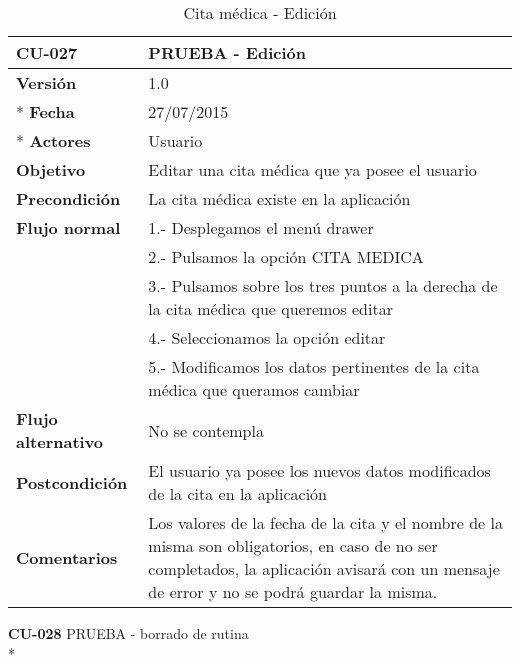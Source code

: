 \documentclass[../pfc.tex]{subfiles}
\begin{document}
		\begin{table}[H]
			\centering
			\begin{tabular}[t]{|p{3cm}|p{9.5cm}|}
				\hline \textbf{CU-027} & \textbf{PRUEBA - Edición} \\*
				\hline\hline \textbf{Versión} & 1.0 \\ *
				\hline\hline \textbf{Fecha} & 27/07/2015 \\ *
				\hline\textbf{Actores} 	& Usuario\\*
				\hline \textbf{Objetivo} & Editar una cita médica que ya posee el usuario\\* 			
				\hline \textbf{Precondición} & La cita médica existe en la aplicación\\* 
				\hline \textbf{Flujo normal} & 1.- Desplegamos el menú drawer \\* 
				& 2.- Pulsamos la opción CITA MEDICA\\*	
				& 3.- Pulsamos sobre los tres puntos a la derecha de la cita médica que queremos editar\\*	
				& 4.- Seleccionamos la opción editar\\*	
				& 5.- Modificamos los datos pertinentes de la cita médica que queramos cambiar\\*	
				\hline \textbf{Flujo alternativo} & No se contempla \\* 
				\hline \textbf{Postcondición} & El usuario ya posee los nuevos datos modificados de la cita en la aplicación \\* 
				\hline \textbf{Comentarios}   & Los valores de la fecha de la cita y el nombre de la misma son obligatorios, en caso de no ser completados, la aplicación avisará con un mensaje de error y no se podrá guardar la misma.\\*
				\hline
			\end{tabular}
			\caption{Cita médica - Edición}
			\label{tabla:caso027}
		\end{table}
		
		
		
		\textbf{CU-028}	PRUEBA - borrado de rutina\\*
		
\end{document}
